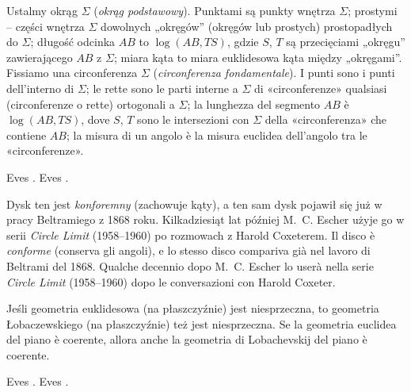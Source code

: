 \begin{definition}
[model Poincarego] %
[modello di Poincaré] %
	Ustalmy okrąg $\Sigma$ (\emph{okrąg podstawowy}). %
	Punktami są punkty wnętrza $\Sigma$; prostymi -- części wnętrza $\Sigma$ dowolnych „okręgów'' (okręgów lub prostych) prostopadłych do $\Sigma$; długość odcinka $AB$ to $\log(AB, TS)$, gdzie $S$, $T$ są przecięciami „okręgu'' zawierającego $AB$ z $\Sigma$; miara kąta to miara euklidesowa kąta między „okręgami''. %
	Fissiamo una circonferenza $\Sigma$ (\emph{circonferenza fondamentale}). %
	I punti sono i punti dell'interno di $\Sigma$; le rette sono le parti interne a $\Sigma$ di «circonferenze» qualsiasi (circonferenze o rette) ortogonali a $\Sigma$; la lunghezza del segmento $AB$ è $\log(AB, TS)$, dove $S$, $T$ sono le intersezioni con $\Sigma$ della «circonferenza» che contiene $AB$; la misura di un angolo è la misura euclidea dell'angolo tra le «circonferenze». %
\end{definition}

Eves \cite[s. 347--348]{eves1_1972}. %
Eves \cite[p. 347--348]{eves1_1972}. %

Dysk ten jest \emph{konforemny} (zachowuje kąty), a ten sam dysk pojawił się już w pracy Beltramiego z 1868 roku. %
Kilkadziesiąt lat później M.~C. Escher użyje go w serii \emph{Circle Limit} (1958--1960) po rozmowach z Harold Coxeterem. %
Il disco è \emph{conforme} (conserva gli angoli), e lo stesso disco compariva già nel lavoro di Beltrami del 1868. %
Qualche decennio dopo M.~C. Escher lo userà nella serie \emph{Circle Limit} (1958--1960) dopo le conversazioni con Harold Coxeter. %
%
%

\begin{proposition}
	Jeśli geometria euklidesowa (na płaszczyźnie) jest niesprzeczna, to geometria Łobaczewskiego (na płaszczyźnie) też jest niesprzeczna. %
	Se la geometria euclidea del piano è coerente, allora anche la geometria di Lobachevskij del piano è coerente. %
\end{proposition}

Eves \cite[s. 347-353]{eves1_1972}. %
Eves \cite[p. 347-353]{eves1_1972}. %

